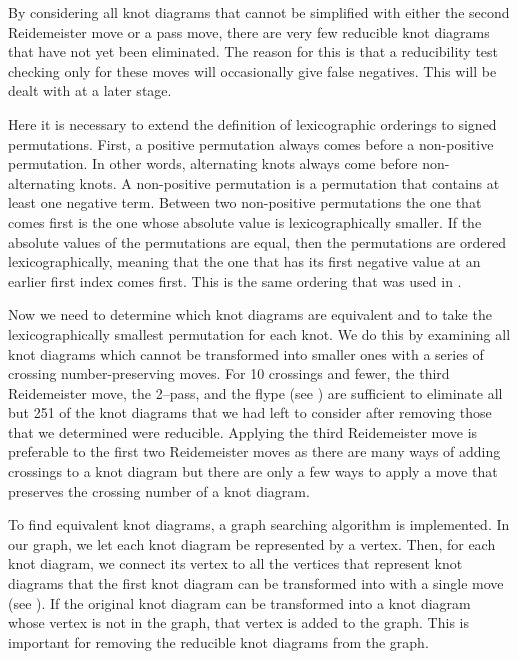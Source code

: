 \begin{paper}

By considering all knot diagrams that cannot be simplified with either the
second Reidemeister move or a pass move, there are very few reducible knot
diagrams that have not yet been eliminated.
The reason for this is that a reducibility test checking only for these moves
will occasionally give false negatives.
This will be dealt with at a later stage.



Here it is necessary to extend the definition of lexicographic orderings to
signed permutations.
First, a positive permutation always comes before a non-positive permutation.
In other words, alternating knots always come before non-alternating knots.
A non-positive permutation is a permutation that contains at least one negative
term.
Between two non-positive permutations the one that comes first is the one whose
absolute value is lexicographically smaller.
If the absolute values of the permutations are equal, then the permutations are
ordered lexicographically, meaning that the one that has its first negative
value at an earlier first index comes first.
This is the same ordering that was used in \cite{htw}.


Now we need to determine which knot diagrams are equivalent and to take the
lexicographically smallest permutation for each knot.
We do this by examining all knot diagrams which cannot be transformed into
smaller ones with a series of crossing number-preserving moves.
For 10 crossings and fewer, the third Reidemeister move, the 2--pass, and the
flype (see \figMoves) are sufficient to eliminate all but 251 of the knot
diagrams that we had left to consider after removing those that we determined
were reducible.
Applying the third Reidemeister move is preferable to the first two
Reidemeister moves as there are many ways of adding crossings to a knot diagram
but there are only a few ways to apply a move that preserves the crossing number
of a knot diagram.


To find equivalent knot diagrams, a graph searching algorithm is implemented.
In our graph, we let each knot diagram be represented by a vertex.
Then, for each knot diagram, we connect its vertex to all the vertices that
represent knot diagrams that the first knot diagram can be transformed into with
a single move (see \figMoves).
If the original knot diagram can be transformed into a knot diagram whose vertex
is not in the graph, that vertex is added to the graph.
This is important for removing the reducible knot diagrams from the graph.


\end{paper}
